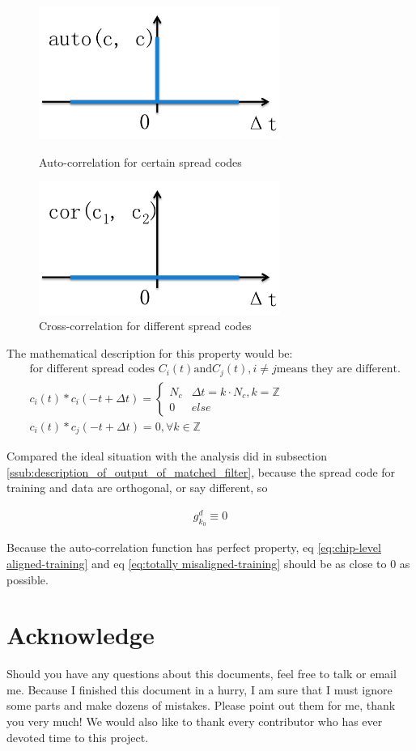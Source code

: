 \documentclass[a4paper]{report}
\begin{document}
\begin{figure}[ht]
	\centering
	\includegraphics[width = 3.1in]{figure/autocorrelation.png}
	\caption{Auto-correlation for certain spread codes}
	\label{fig:auto-correlation}
	\includegraphics[width = 3.1in]{figure/cross-correlation.png}
	\caption{Cross-correlation for different spread codes}
	\label{fig:cross-correlatino}
\end{figure}

The mathematical description for this property would be:
\begin{align}
	&\text{for different spread codes }C_i(t) \text{and} C_j(t), i \neq j \text{means they are different.} \nonumber\\
	&c_i(t) \ast c_i(-t + \Delta t) = 
	\begin{cases}
		N_c &	\Delta t = k \cdot N_c, k = \mathbb{Z}\\
		0 	& 	else
	\end{cases}\\
	&c_i(t) \ast c_j(-t + \Delta t) = 0, \forall k \in \mathbb{Z}
\end{align}

Compared the ideal situation with the analysis did in subsection \ref{ssub:description_of_output_of_matched_filter}, because the spread code for training and data are orthogonal, or say different, so 

\begin{align}
	g^d_{k_0} \equiv 0
\end{align}

Because the auto-correlation function has perfect property, eq \ref{eq:chip-level aligned-training} and eq \ref{eq:totally misaligned-training} should be as close to 0 as possible.

\chapter{Acknowledge}
Should you have any questions about this documents, feel free to talk or email me. Because I finished this document in a hurry, I am sure that I must ignore some parts and make dozens of mistakes. Please point out them for me, thank you very much!
We would also like to thank every contributor who has ever devoted time to this project. 



\end{document}
